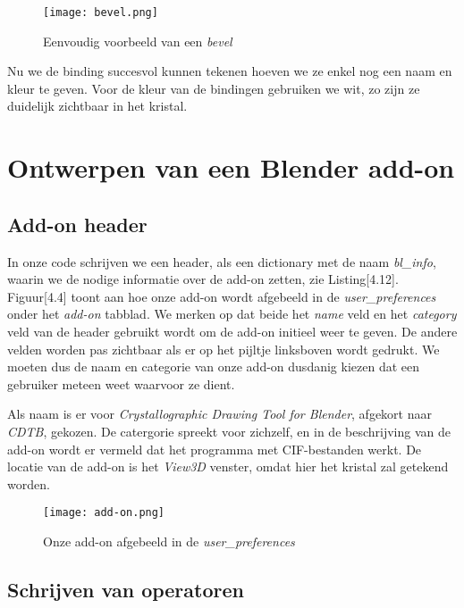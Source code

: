 \begin{figure}[H]
\texttt{[image: bevel.png]}
\caption{Eenvoudig voorbeeld van een \textit{bevel}}
\end{figure}

Nu we de binding succesvol kunnen tekenen hoeven we ze enkel nog een naam en kleur te geven. Voor de kleur van de bindingen gebruiken we wit, zo zijn ze duidelijk zichtbaar in het kristal.

\section{Ontwerpen van een Blender add-on}

\subsection{Add-on header}

In onze code schrijven we een header, als een dictionary met de naam \textit{bl\_info}, waarin we de nodige informatie over de add-on zetten, zie Listing[4.12]. Figuur[4.4] toont aan hoe onze add-on wordt afgebeeld in de \textit{user\_preferences} onder het \textit{add-on} tabblad. We merken op dat beide het \textit{name} veld en het \textit{category} veld van de header gebruikt wordt om de add-on initieel weer te geven. De andere velden worden pas zichtbaar als er op het pijltje linksboven wordt gedrukt. We moeten dus de naam en categorie van onze add-on dusdanig kiezen dat een gebruiker meteen weet waarvoor ze dient. 



Als naam is er voor \textit{Crystallographic Drawing Tool for Blender}, afgekort naar \textit{CDTB}, gekozen. De catergorie spreekt voor zichzelf, en in de beschrijving van de add-on wordt er vermeld dat het programma met CIF-bestanden werkt. De locatie van de add-on is het \textit{View3D} venster, omdat hier het kristal zal  getekend worden.

\begin{figure}[H]
\texttt{[image: add-on.png]}
\caption{Onze add-on afgebeeld in de \textit{user\_preferences}}
\end{figure}

\subsection{Schrijven van operatoren}

